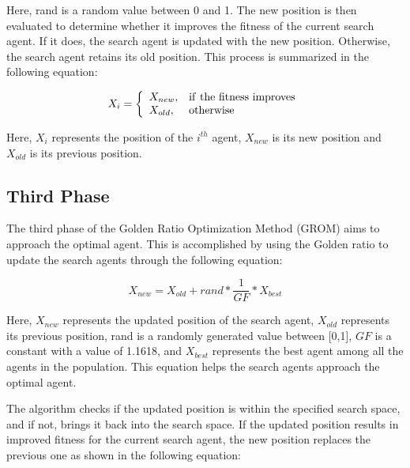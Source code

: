Here, rand is a random value between 0 and 1. The new position is then evaluated to determine whether it improves the fitness of the current search agent. If it does, the search agent is updated with the new position. Otherwise, the search agent retains its old position. This process is summarized in the following equation:

\begin{equation}
X_{i}=\left\{\begin{array}{l l}{X_{n e w},}&{\mathrm{if~the~fitness~improves}}\\ {X_{o l d},}&{\mathrm{otherwise}}\end{array}\right.
\end{equation}

Here, $X_{i}$ represents the position of the $i^{t h}$ agent, $X_{n e w}$ is its new position and $X_{o l d}$ is its previous position.

\subsection{Third Phase}

The third phase of the Golden Ratio Optimization Method (GROM) aims to approach the optimal agent. This is accomplished by using the Golden ratio to update the search agents through the following equation:

\begin{equation}
X_{n e w}=X_{o l d}+r a n d*\frac{1}{G F}*X_{b e s t}
\end{equation}

Here, $X_{n e w}$ represents the updated position of the search agent, $X_{o l d}$ represents its previous position, rand is a randomly generated value between [0,1], $G F$ is a constant with a value of 1.1618, and $X_{b e s t}$ represents the best agent among all the agents in the population. This equation helps the search agents approach the optimal agent.

The algorithm checks if the updated position is within the specified search space, and if not, brings it back into the search space. If the updated position results in improved fitness for the current search agent, the new position replaces the previous one as shown in the following equation:
